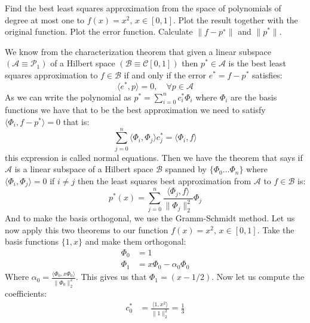 \begin{problem}
  Find the best least squares approximation from the space of
  polynomials of degree at most one to $f(x) = x^2 ,\, x \in [0, 1]$. Plot
  the result together with the original function. Plot the error
  function. Calculate $\| f - p^∗ \|$ and $\| p^*\|$.
\end{problem}

\begin{solution}
We know from the characterization theorem that given a linear subspace $(\mathcal{A} \equiv \mathcal{P}_1)$ of a Hilbert space $(\mathcal{B} \equiv \mathcal{C}[0,1])$ then $p^* \in \mathcal{A}$ is the best least squares approximation to $f \in \mathcal{B}$ if and only if the error $e^* = f - p^*$ satisfies:
\begin{equation*}
\langle e^*,p \rangle = 0, \quad \forall p \in \mathcal{A}
\end{equation*}
As we can write the polynomial as $p^* = \sum_{i=0}^n c_i^* \Phi_i$ where $\Phi_i$ are the basis functions we have that to be the best approximation we need to satisfy $\langle \Phi_i, f-p^* \rangle=0$ that is:
\begin{equation*}
\sum_{j=0}^n \langle \Phi_i,\Phi_j\rangle c_j^* = \langle \Phi_i,f\rangle
\end{equation*}
this expression is called normal equations. Then we have the theorem that says if $\mathcal{A}$ is a linear subspace of  a Hilbert space $\mathcal{B}$ spanned by $\{\Phi_0 \ldots \Phi_n\}$ where $\langle \Phi_i,\Phi_j \rangle = 0$ if $i \neq j$ then the least squares best approximation from $\mathcal{A}$ to $f \in \mathcal{B}$ is:
\begin{equation}
p^*(x) = \sum_{j=0}^n \frac{\langle \Phi_j, f\rangle}{\lVert\Phi_j\rVert_2^2}\Phi_j
\label{bestlsq}
\end{equation}
And to make the basis orthogonal, we use the Gramm-Schmidt method. Let us now apply this two theorems to our function $f(x) = x^2, \, x\in[0,1]$. Take the basis functions $\{1,x\}$ and make them orthogonal:
\begin{align*}
\Phi_0 &= 1 \\
\Phi_1 &=x\Phi_0 - \alpha_0\Phi_0
\end{align*}
Where $\alpha_0 = \frac{\langle \Phi_0, x\Phi_0 \rangle}{\lVert \Phi_0 \rVert_2^2}$. This gives us that $\Phi_1 = (x-1/2)$. Now let us compute the coefficients:
\begin{align*}
c_0^* &= \frac{\langle 1,x^2 \rangle}{\lVert 1 \rVert_2^2}=\frac{1}{3}\\

\end{align*}
\end{solution}
